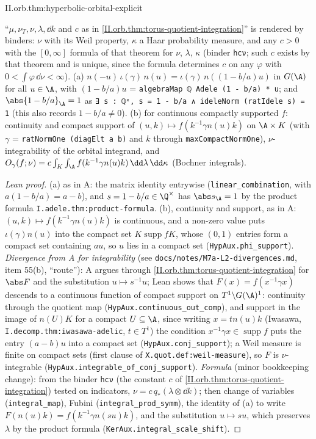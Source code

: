 \begin{tfformal}{II.orb.thm:hyperbolic-orbital-explicit}
\begin{tffidelity}
``$\mu,\nu_T,\nu,\lambda,\dd k$ and $c$ as in \cref{II.orb.thm:torus-quotient-integration}'' is rendered by binders: $\nu$ with its Weil property, $\kappa$ a Haar probability measure, and any $c>0$ with the $[0,\infty]$ formula of that theorem for $\nu$, $\lambda$, $\kappa$ (binder \texttt{hcν}; such $c$ exists by that theorem and is unique, since the formula determines $c$ on any $\varphi$ with $0<\int\varphi\,\dd\nu<\infty$). (a) $n(-u)\,\iota(\gamma)\,n(u)=\iota(\gamma)\,n((1-b/a)u)$ in $G(\A)$ for all $u\in\A$, with $(1-b/a)u$ = \texttt{algebraMap ℚ Adele (1 - b/a) * u}; and $\abs{1-b/a}_\A=1$ as \texttt{∃ s : ℚˣ, s = 1 - b/a ∧ ideleNorm (ratIdele s) = 1} (this also records $1-b/a\ne0$). (b) for continuous compactly supported $f$: continuity and compact support of $(u,k)\mapsto f(k^{-1}\gamma n(u)k)$ on $\A\times K$ (with $\gamma$ = \texttt{ratNormOne (diagElt a b)} and $k$ through \texttt{maxCompactNormOne}), $\nu$-integrability of the orbital integrand, and $O_\gamma(f;\nu)=c\int_K\int_\A f(k^{-1}\gamma n(u)k)\,\dd\lambda\,\dd\kappa$ (Bochner integrals).
\end{tffidelity}
\end{tfformal}
\begin{proof}[Lean proof]
(a) as in A: the matrix identity entrywise (\texttt{linear\_combination}, with $a(1-b/a)=a-b$), and $s=1-b/a\in\Q^\times$ has $\abs s_\A=1$ by the product formula \texttt{I.adele.thm:product-formula}. (b), continuity and support, as in A: $(u,k)\mapsto f(k^{-1}\gamma n(u)k)$ is continuous, and a non-zero value puts $\iota(\gamma)n(u)$ into the compact set $K\operatorname{supp}fK$, whose $(0,1)$ entries form a compact set containing $au$, so $u$ lies in a compact set (\texttt{HypAux.phi\_support}). \emph{Divergence from A for integrability} (see \texttt{docs/notes/M7a-L2-divergences.md}, item 55(b), ``route''): A argues through \cref{II.orb.thm:torus-quotient-integration} for $\abs F$ and the substitution $u\mapsto s^{-1}u$; Lean shows that $F(x)=f(x^{-1}\gamma x)$ descends to a continuous function of compact support on $T^1\backslash G(\A)^1$: continuity through the quotient map (\texttt{HypAux.continuous\_out\_comp}), and support in the image of $n(U)K$ for a compact $U\subseteq\A$, since writing $x=tn(u)k$ (Iwasawa, \texttt{I.decomp.thm:iwasawa-adelic}, $t\in T^1$) the condition $x^{-1}\gamma x\in\operatorname{supp}f$ puts the entry $(a-b)u$ into a compact set (\texttt{HypAux.conj\_support}); a Weil measure is finite on compact sets (first clause of \texttt{X.quot.def:weil-measure}), so $F$ is $\nu$-integrable (\texttt{HypAux.integrable\_of\_conj\_support}). \emph{Formula} (minor bookkeeping change): from the binder \texttt{hcν} (the constant $c$ of \cref{II.orb.thm:torus-quotient-integration}) tested on indicators, $\nu=c\,q_*(\lambda\otimes\dd k)$; then change of variables (\texttt{integral\_map}), Fubini (\texttt{integral\_prod\_symm}), the identity of (a) to write $F(n(u)k)=f(k^{-1}\gamma n(su)k)$, and the substitution $u\mapsto su$, which preserves $\lambda$ by the product formula (\texttt{KerAux.integral\_scale\_shift}).
\end{proof}


